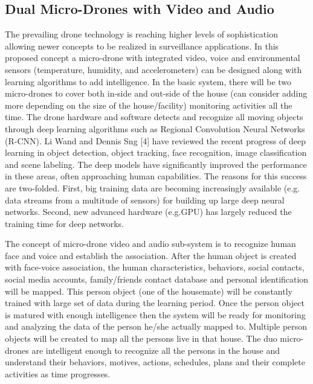 \documentclass[sigconf]{acmart}
\begin{document}
\subsection{Dual Micro-Drones with Video and Audio}
The prevailing drone technology is reaching higher levels of sophistication allowing newer concepts to be realized in surveillance applications. In this proposed concept a micro-drone with integrated video, voice and environmental sensors (temperature, humidity, and accelerometers) can be designed along with learning algorithms to add intelligence. In the basic system, there will be two micro-drones to cover both in-side and out-side of the house (can consider adding more depending on the size of the house/facility) monitoring activities all the time. The drone hardware and software detects and recognize all moving objects through deep learning algorithms such as Regional Convolution Neural Networks (R-CNN). Li Wand and Dennis Sng [4] have reviewed the recent progress of deep learning in object detection, object tracking, face recognition, image classification and scene labeling. The deep models have significantly improved the performance in these areas, often approaching human capabilities. The reasons for this success are two-folded. First, big training data are becoming increasingly available (e.g. data streams from a multitude of sensors) for building up large deep neural networks. Second, new advanced hardware (e.g.GPU) has largely reduced the training time for deep networks. 

The concept of micro-drone video and audio sub-system is to recognize human face and voice and establish the association. After the human object is created with face-voice association, the human characteristics, behaviors, social contacts, social media accounts, family/friends contact database and personal identification will be mapped. This person object (one of the housemate) will be constantly trained with large set of data during the learning period. Once the person object is matured with enough intelligence then the system will be ready for monitoring and analyzing the data of the person he/she actually mapped to. Multiple person objects will be created to map all the persons live in that house. The duo micro-drones are intelligent enough to recognize all the persons in the house and understand their behaviors, motives, actions, schedules, plans and their complete activities as time progresses.  
\end{document}
